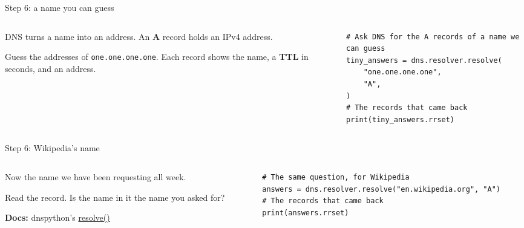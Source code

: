 \documentclass[9pt,aspectratio=169]{beamer}
\begin{document}
\begin{frame}[fragile]{Step 6: a name you can guess}
    \begin{columns}[T]
        \begin{column}{0.37\textwidth}
            DNS turns a name into an address. An \textbf{A} record holds an IPv4 address.

            \medskip
            Guess the addresses of \texttt{one.one.one.one}. Each record shows the name, a \textbf{TTL} in seconds, and an address.
        \end{column}
        \begin{column}{0.6\textwidth}
\begin{lstlisting}[style=lab]
# Ask DNS for the A records of a name we can guess
tiny_answers = dns.resolver.resolve(
    "one.one.one.one",
    "A",
)
# The records that came back
print(tiny_answers.rrset)
\end{lstlisting}
        \end{column}
    \end{columns}
\end{frame}

\begin{frame}[fragile]{Step 6: Wikipedia's name}
    \begin{columns}[T]
        \begin{column}{0.37\textwidth}
            Now the name we have been requesting all week.

            \medskip
            Read the record. Is the name in it the name you asked for?

            \medskip
            {\scriptsize\textbf{Docs:} dnspython's \href{https://dnspython.readthedocs.io/en/stable/resolver-functions.html\#dns.resolver.resolve}{resolve()}\par}
        \end{column}
        \begin{column}{0.6\textwidth}
\begin{lstlisting}[style=lab]
# The same question, for Wikipedia
answers = dns.resolver.resolve("en.wikipedia.org", "A")
# The records that came back
print(answers.rrset)
\end{lstlisting}
        \end{column}
    \end{columns}
\end{frame}
\end{document}
